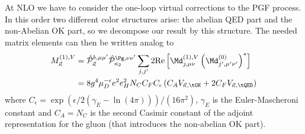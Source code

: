 At NLO we have to consider the one-loop virtual corrections to the PGF process. In this order two different color structures arise: the abelian QED part and the non-Abelian OK part, so we decompose our result by this structure. The needed matrix elements can then be written analog to \cite{Hekhorn:2018ywm}
\begin{align}
M_{\vec \kappa}^{(1),V}&=\hat {\mathcal P}_{\vec \kappa}^{b,\mu\mu'}\hat {\mathcal P}_{\kappa_2}^{\Pg,\nu\nu'}\sum_{j,j'}2\text{Re}\left[\Md^{(1),V}_{j,\mu\nu}\left(\Md^{(0)}_{j',\mu'\nu'}\right)^*\right] \nonumber\\
 &= 8g^4\mu_D^{-\epsilon}e^2e_H^2 N_C C_FC_\epsilon\left( C_A V_{\vec \kappa,\tOK} + 2C_F V_{\vec \kappa,\tQED}\right)
\end{align}
where $C_\epsilon = \exp(\epsilon/2(\gamma_E-\ln(4\pi)))/(16\pi^2)$, $\gamma_E$ is the Euler-Mascheroni constant and $C_A=N_C$ is the second Casimir constant of the adjoint representation for the gluon (that introduces the non-abelian OK part).

